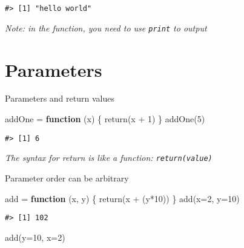 \documentclass[
]{book}
\newenvironment{Shaded}{\begin{snugshade}}{\end{snugshade}}
\newcommand{\AttributeTok}[1]{\textcolor[rgb]{0.77,0.63,0.00}{#1}}
\newcommand{\ControlFlowTok}[1]{\textcolor[rgb]{0.13,0.29,0.53}{\textbf{#1}}}
\newcommand{\DecValTok}[1]{\textcolor[rgb]{0.00,0.00,0.81}{#1}}
\newcommand{\FunctionTok}[1]{\textcolor[rgb]{0.00,0.00,0.00}{#1}}
\newcommand{\NormalTok}[1]{#1}
\newcommand{\OtherTok}[1]{\textcolor[rgb]{0.56,0.35,0.01}{#1}}
\newcommand{\SpecialCharTok}[1]{\textcolor[rgb]{0.00,0.00,0.00}{#1}}
\begin{document}
\begin{verbatim}
#> [1] "hello world"
\end{verbatim}

\emph{Note: in the function, you need to use \texttt{print} to output}

\hypertarget{parameters}{%
\section{Parameters}\label{parameters}}

Parameters and return values

\begin{Shaded}
\begin{Highlighting}[]
\NormalTok{addOne }\OtherTok{=} \ControlFlowTok{function}\NormalTok{ (x) \{}
  \FunctionTok{return}\NormalTok{(x }\SpecialCharTok{+} \DecValTok{1}\NormalTok{)}
\NormalTok{\}}
\FunctionTok{addOne}\NormalTok{(}\DecValTok{5}\NormalTok{)}
\end{Highlighting}
\end{Shaded}

\begin{verbatim}
#> [1] 6
\end{verbatim}

\emph{The syntax for return is like a function: \texttt{return(value)}}

Parameter order can be arbitrary

\begin{Shaded}
\begin{Highlighting}[]
\NormalTok{add }\OtherTok{=} \ControlFlowTok{function}\NormalTok{ (x, y) \{}
  \FunctionTok{return}\NormalTok{(x }\SpecialCharTok{+}\NormalTok{ (y}\SpecialCharTok{*}\DecValTok{10}\NormalTok{))}
\NormalTok{\}}
\FunctionTok{add}\NormalTok{(}\AttributeTok{x=}\DecValTok{2}\NormalTok{, }\AttributeTok{y=}\DecValTok{10}\NormalTok{)}
\end{Highlighting}
\end{Shaded}

\begin{verbatim}
#> [1] 102
\end{verbatim}

\begin{Shaded}
\begin{Highlighting}[]
\FunctionTok{add}\NormalTok{(}\AttributeTok{y=}\DecValTok{10}\NormalTok{, }\AttributeTok{x=}\DecValTok{2}\NormalTok{)}
\end{Highlighting}
\end{Shaded}
\end{document}
